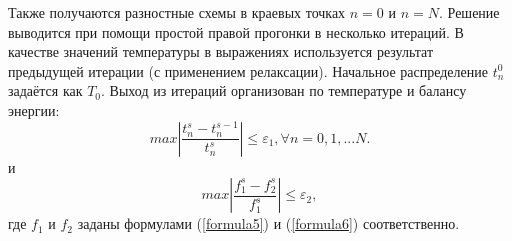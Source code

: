 Также получаются разностные схемы в краевых точках $n = 0$ и $n = N$. Решение выводится при помощи простой правой прогонки в несколько итераций. В качестве значений температуры в выражениях используется результат предыдущей итерации (с применением релаксации). Начальное распределение $t_n^0$ задаётся как $T_0$. Выход из итераций организован по температуре и балансу энергии:
\begin{equation}
	max|\dfrac{t_n^{s} - t_n^{s-1}}{t_n^{s}}| \leq \varepsilon_{1}, \forall n = 0, 1, ... N.
\end{equation}
и
\begin{equation}
	max|\dfrac{f_1^{s} - f_2^{s}}{f_1^{s}}| \leq \varepsilon_{2},
\end{equation}
где $f_1$ и $f_2$ заданы формулами (\ref{formula5}) и (\ref{formula6}) соответственно. \\


